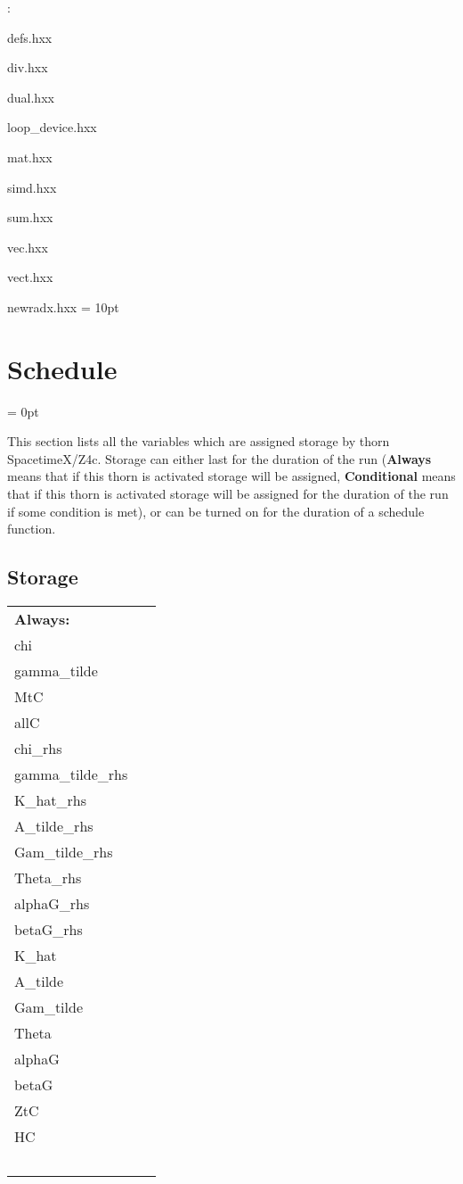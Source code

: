 \vspace{5mm}

: 

defs.hxx

div.hxx

dual.hxx

loop\_device.hxx

mat.hxx

simd.hxx

sum.hxx

vec.hxx

vect.hxx

newradx.hxx
\vspace{2mm}\parskip = 10pt 

\section{Schedule} 


\parskip = 0pt


\noindent This section lists all the variables which are assigned storage by thorn SpacetimeX/Z4c.  Storage can either last for the duration of the run ({\bf Always} means that if this thorn is activated storage will be assigned, {\bf Conditional} means that if this thorn is activated storage will be assigned for the duration of the run if some condition is met), or can be turned on for the duration of a schedule function.


\subsection*{Storage}

\hspace{5mm}

 \begin{tabular*}{160mm}{ll} 

{\bf Always:}&  ~ \\ 
 chi & ~\\ 
 gamma\_tilde & ~\\ 
 MtC & ~\\ 
 allC & ~\\ 
 chi\_rhs & ~\\ 
 gamma\_tilde\_rhs & ~\\ 
 K\_hat\_rhs & ~\\ 
 A\_tilde\_rhs & ~\\ 
 Gam\_tilde\_rhs & ~\\ 
 Theta\_rhs & ~\\ 
 alphaG\_rhs & ~\\ 
 betaG\_rhs & ~\\ 
 K\_hat & ~\\ 
 A\_tilde & ~\\ 
 Gam\_tilde & ~\\ 
 Theta & ~\\ 
 alphaG & ~\\ 
 betaG & ~\\ 
 ZtC & ~\\ 
 HC & ~\\ 
~ & ~\\ 
\end{tabular*} 



